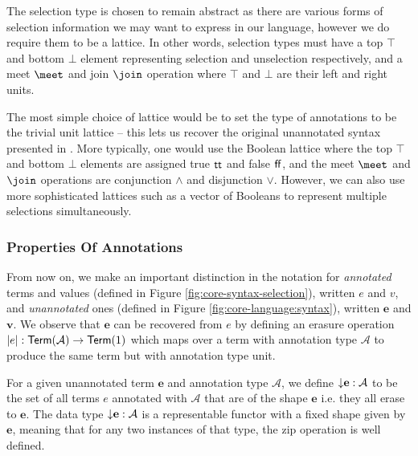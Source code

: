 
The selection type is chosen to remain abstract as there are various forms of selection information we may want to express in our language, however we do require them to be a lattice. In other words, selection types must have a top $\top$ and bottom $\bot$ element representing selection and unselection respectively, and a meet $\meet$ and join $\join$ operation where $\top$ and $\bot$ are their left and right units.

The most simple choice of lattice would be to set the type of annotations to be the trivial unit lattice -- this lets us recover the original unannotated syntax presented in . More typically, one would use the Boolean lattice where the top $\top$ and bottom $\bot$ elements are assigned true $\mathsf{tt}$ and false $\mathsf{ff}$, and the meet $\meet$ and $\join$ operations are conjunction $\land$ and disjunction $\lor$. However, we can also use more sophisticated lattices such as a vector of Booleans to represent multiple selections simultaneously.

\subsubsection{Properties Of Annotations}

From now on, we make an important distinction in the notation for \textit{annotated} terms and values (defined in Figure \ref{fig:core-syntax-selection}), written $e$ and $v$, and \textit{unannotated} ones (defined in Figure \ref{fig:core-language:syntax}), written $\mathbf{e}$ and $\mathbf{v}$. We observe that $\mathbf{e}$ can be recovered from $e$ by defining an erasure operation $|e| : {\textup{\textsf{Term}}({\mathcal{A}})}\rightarrow{\textup{\textsf{Term}}({\mathrm{1}})}$ which maps over a term with annotation type $\mathcal{A}$ to produce the same term but with annotation type unit.

For a given unannotated term $\mathbf{e}$ and annotation type $\mathcal{A}$, we define ${\downarrow}{\mathbf{e}} : \mathcal{A}$ to be the set of all terms $e$ annotated with $\mathcal{A}$ that are of the shape $\mathbf{e}$ i.e. they all erase to $\mathbf{e}$. The data type ${\downarrow}{\mathbf{e}} : \mathcal{A}$ is a representable functor with a fixed shape given by $\mathbf{e}$, meaning that for any two instances of that type, the zip operation is well defined.

